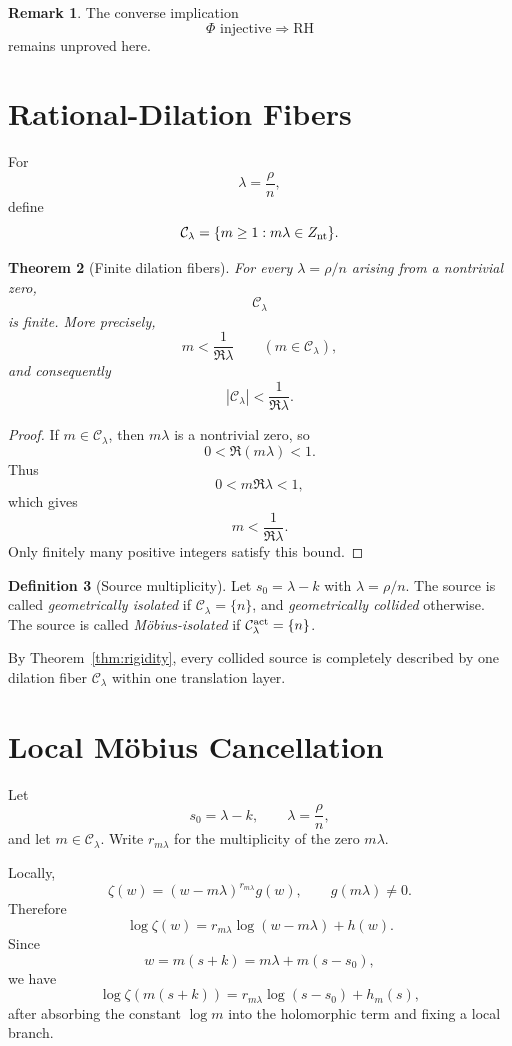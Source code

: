 \documentclass[11pt]{article}
\newtheorem{theorem}{Theorem}[section]
\theoremstyle{definition}
\newtheorem{definition}[theorem]{Definition}
\newtheorem{remark}[theorem]{Remark}
\newcommand{\C}{\mathcal C}
\newcommand{\Znt}{Z_{\rm nt}}
\newcommand{\PhiA}{\Phi}
\begin{document}
\begin{remark}
The converse implication
\[
\PhiA\text{ injective}\Longrightarrow\mathrm{RH}
\]
remains unproved here.
\end{remark}

\section{Rational-Dilation Fibers}

For
\[
\lambda=\frac{\rho}{n},
\]
define
\[
\C_\lambda=
\{m\ge1:m\lambda\in\Znt\}.
\]

\begin{theorem}[Finite dilation fibers]
\label{thm:fiber}
For every $\lambda=\rho/n$ arising from a nontrivial zero,
\[
\C_\lambda
\]
is finite. More precisely,
\[
m<\frac1{\Re\lambda}
\qquad(m\in\C_\lambda),
\]
and consequently
\[
|\C_\lambda|<\frac1{\Re\lambda}.
\]
\end{theorem}

\begin{proof}
If $m\in\C_\lambda$, then $m\lambda$ is a nontrivial zero, so
\[
0<\Re(m\lambda)<1.
\]
Thus
\[
0<m\Re\lambda<1,
\]
which gives
\[
m<\frac1{\Re\lambda}.
\]
Only finitely many positive integers satisfy this bound.
\end{proof}

\begin{definition}[Source multiplicity]
Let $s_0=\lambda-k$ with $\lambda=\rho/n$. The source is called \emph{geometrically isolated} if $\mathcal C_\lambda=\{n\}$, and \emph{geometrically collided} otherwise. The source is called \emph{Möbius-isolated} if $\mathcal C_\lambda^{\rm act}=\{n\}$.
\end{definition}

By Theorem~\ref{thm:rigidity}, every collided source is completely described by one dilation fiber $\C_\lambda$ within one translation layer.

\section{Local Möbius Cancellation}

Let
\[
s_0=\lambda-k,
\qquad
\lambda=\frac{\rho}{n},
\]
and let $m\in\C_\lambda$. Write $r_{m\lambda}$ for the multiplicity of the zero $m\lambda$.

Locally,
\[
\zeta(w)=(w-m\lambda)^{r_{m\lambda}}g(w),
\qquad
g(m\lambda)\ne0.
\]
Therefore
\[
\log\zeta(w)
=
r_{m\lambda}\log(w-m\lambda)+h(w).
\]
Since
\[
w=m(s+k)
=
m\lambda+m(s-s_0),
\]
we have
\[
\log\zeta(m(s+k))
=
r_{m\lambda}\log(s-s_0)+h_m(s),
\]
after absorbing the constant $\log m$ into the holomorphic term and fixing a local branch.
\end{document}
